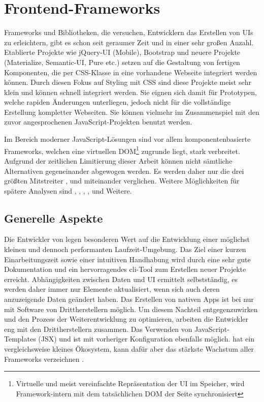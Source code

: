 \section{Frontend-Frameworks}
Frameworks und Bibliotheken, die versuchen, Entwicklern das Erstellen von UIs zu erleichtern, gibt es schon seit geraumer Zeit und in einer sehr großen Anzahl. Etablierte Projekte wie jQuery-UI (Mobile), Bootstrap und neuere Projekte (Materialize, Semantic-UI, Pure etc.) setzen auf die Gestaltung von fertigen Komponenten, die per CSS-Klasse in eine vorhandene Webseite integriert werden können. Durch diesen Fokus auf Styling mit CSS sind diese Projekte meist sehr klein und können schnell integriert werden. Sie eignen sich damit für Prototypen, welche rapiden Änderungen unterliegen, jedoch nicht für die vollständige Erstellung kompletter Webseiten. Sie können vielmehr im Zusammenspiel mit den zuvor angesprochenen JavaScript-Projekten benutzt werden.

Im Bereich moderner JavaScript-Lösungen sind vor allem komponentenbasierte Frameworks, welchen eine virtuellen DOM\footnote{Virtuelle und meist vereinfachte Repräsentation der UI im Speicher, wird Framework-intern mit dem tatsächlichen DOM der Seite synchronisiert} zugrunde liegt, stark verbreitet. Aufgrund der zeitlichen Limitierung dieser Arbeit können nicht sämtliche Alternativen gegeneinander abgewogen werden. Es werden daher nur die drei größten Mitstreiter ,  und  \parencite[vgl.][]{greif_benitte_rambeau_2018} miteinander verglichen. Weitere Möglichkeiten für spätere Analysen sind , , , , und Weitere.

\subsection{Generelle Aspekte}
Die Entwickler von  legen besonderen Wert auf die Entwicklung einer möglichst kleinen und dennoch performanten Laufzeit-Umgebung. Das Ziel einer kurzen Einarbeitungszeit sowie einer intuitiven Handhabung wird durch eine sehr gute Dokumentation und ein hervorragendes \gls{cli}-Tool zum Erstellen neuer Projekte erreicht. Abhängigkeiten zwischen Daten und UI ermittelt  selbstständig, es werden daher immer nur Elemente aktualisiert, wenn sich auch deren anzuzeigende Daten geändert haben. Das Erstellen von nativen Apps ist bei  nur mit Software von Drittherstellern möglich. Um diesem Nachteil entgegenzuwirken und den Prozess der Weiterentwicklung zu optimieren, arbeiten die Entwickler eng mit den Drittherstellern zusammen. Das Verwenden von JavaScript-Templates (JSX) und  ist mit vorheriger Konfiguration ebenfalls möglich.  hat ein vergleichsweise kleines Ökosystem, kann dafür aber das stärkste Wachstum aller Frameworks verzeichnen \parencite[vgl.][]{npmjs_2018}.

